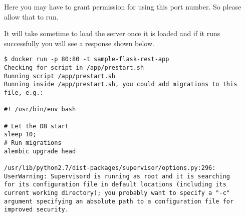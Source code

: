 Here you may have to grant permission for using this port number. So
please allow that to run.

It will take sometime to load the server once it is loaded and if it
runs successfully you will see a response shown below.

\begin{lstlisting}[basicstyle=\footnotesize]
$ docker run -p 80:80 -t sample-flask-rest-app
Checking for script in /app/prestart.sh
Running script /app/prestart.sh
Running inside /app/prestart.sh, you could add migrations to this file, e.g.:

#! /usr/bin/env bash

# Let the DB start
sleep 10;
# Run migrations
alembic upgrade head

/usr/lib/python2.7/dist-packages/supervisor/options.py:296:
UserWarning: Supervisord is running as root and it is searching
for its configuration file in default locations (including its
current working directory); you probably want to specify a "-c"
argument specifying an absolute path to a configuration file for
improved security.


\end{lstlisting}
